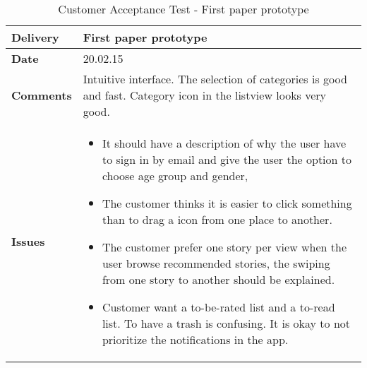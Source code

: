 			\renewcommand{\arraystretch}{2}%
			\begin{center}
				\begin{longtable}{ | p{4cm} | p{13cm} | }
					
					\caption[Customer Acceptance test]{Customer Acceptance Test - First paper prototype } \label{Tab:cattest1}\\
					\hline
					\textbf{Delivery} & First paper prototype\\ \hline
					\textbf{Date} & 20.02.15 \\ \hline 
					\textbf{Comments} &Intuitive interface. The selection of categories is good and fast. Category icon in the listview looks very good.
					\\ \hline
					\textbf{Issues} &	
					\begin{itemize}
						\item It should have a description of why the user have to sign in by email and give the user the option to choose age group and gender,
						\item The customer thinks it is easier to click something than to drag a icon from one place to another. 
						\item The customer prefer one story per view when the user browse recommended stories, the swiping from one story to another should be explained. 
						\item Customer want a to-be-rated list and a to-read list. To have a trash is confusing. It is okay to not prioritize the notifications in the app. 
					\end{itemize}	
					\\ \hline
					
				\end{longtable}
			\end{center}
			

